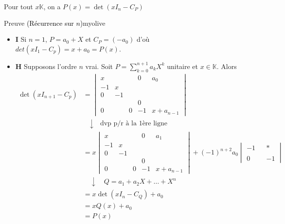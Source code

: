     \begin{prop}{}{}
        Pour tout $x \mathbb{K}$, on a $P(x) = \det(x I_n - C_P)$
    \end{prop}

    \begin{demo}{Preuve \textcolor{black}{(Récurrence sur $n$)}}{myolive}
        \begin{itemize}
            \item \textbf{I} \quad Si $n = 1$, $P = a_0 + X$ et $C_P = (-a_0)$ d’où $det(x I_1 - C_p) = x + a_0 = P(x)$.
            \item \textbf{H} \quad Supposons l’ordre $n$ vrai. Soit $P = \sum_{k=0}^{n+1} a_k X^k$ unitaire et $x \in \mathbb{K}$. Alors 
            \begin{align*}
                \det(x I_{n+1} - C_p) 
                &= \begin{vmatrix}
                    x & & & 0 & a_0 \\
                    - 1 & x & & & \\
                    0 & - 1 & & & \\
                    & & & 0 & \\
                    0 & & 0 & - 1 & x + a_{n-1}
                \end{vmatrix} \\
                &\quad \downarrow \quad \text{dvp p/r à la 1ère ligne} \\
                &= x \begin{vmatrix}
                    x & & & 0 & a_1 \\
                    - 1 & x & & & \\
                    0 & - 1 & & & \\
                    & & & 0 & \\
                    0 & & 0 & -1 & x + a_{n-1}
                \end{vmatrix} + (-1)^{n+2} a_0 \begin{vmatrix}
                    -1 & & * \\
                    & & \\
                    0 & & -1
                \end{vmatrix} \\
                &\quad \downarrow \quad Q = a_1 + a_2 X + \ldots + X^n \\
                &= x \det(x I_n - C_Q) + a_0 \\
                &= x Q(x) + a_0 \\
                &= P(x)
            \end{align*}
        \end{itemize}
    \end{demo}

